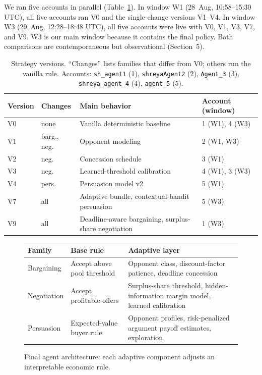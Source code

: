 \documentclass{article}
\begin{document}
We ran five accounts in parallel (Table~\ref{tab:versions}). In window W1 (28~Aug, 10:58--15:30 UTC), all five accounts ran V0 and the single-change versions V1--V4. In window W3 (29~Aug, 12:28--18:48 UTC), all five accounts were live with V0, V1, V3, V7, and V9. W3 is our main window because it contains the final policy. Both comparisons are contemporaneous but observational (Section~5).

\begin{table}[H]
\caption{Strategy versions. ``Changes'' lists families that differ from V0; others run the vanilla rule. Accounts: \texttt{sh\_agent1} (1), \texttt{shreyaAgent2} (2), \texttt{Agent\_3} (3), \texttt{shreya\_agent\_4} (4), \texttt{agent\_5} (5).}
\label{tab:versions}
\centering
\small
\begin{tabular}{llll}
\toprule
Version & Changes & Main behavior & Account (window) \\
\midrule
V0 & none & Vanilla deterministic baseline & 1 (W1), 4 (W3) \\
V1 & barg., neg. & Opponent modeling & 2 (W1, W3) \\
V2 & neg. & Concession schedule & 3 (W1) \\
V3 & neg. & Learned-threshold calibration & 4 (W1), 3 (W3) \\
V4 & pers. & Persuasion model v2 & 5 (W1) \\
V7 & all & Adaptive bundle, contextual-bandit persuasion & 5 (W3) \\
V9 & all & Deadline-aware bargaining, surplus-share negotiation & 1 (W3) \\
\bottomrule
\end{tabular}
\end{table}

\begin{figure}[!t]
\centering
\small
\begin{tabular}{>{\raggedright\arraybackslash}p{1.05in}>{\raggedright\arraybackslash}p{1.25in}p{2.7in}}
\toprule
Family & Base rule & Adaptive layer \\
\midrule
Bargaining & Accept above pool threshold & Opponent class, discount-factor patience, deadline concession \\
Negotiation & Accept profitable offers & Surplus-share threshold, hidden-information margin model, learned calibration \\
Persuasion & Expected-value buyer rule & Opponent profiles, risk-penalized argument payoff estimates, exploration \\
\bottomrule
\end{tabular}
\caption{Final agent architecture: each adaptive component adjusts an interpretable economic rule.}
\label{fig:architecture}
\end{figure}
\end{document}
